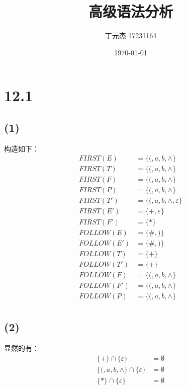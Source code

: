 \documentclass[UTF8]{ctexart}
\title{高级语法分析}
\author{丁元杰 17231164}
\date{\today}
\begin{document}
\maketitle


\section*{12.1}

    \subsection*{(1)}
        构造如下：
        \begin{align*}
            FIRST(E) &= \{(, a, b, \wedge\} \\
            FIRST(T) &= \{(, a, b, \wedge\} \\
            FIRST(F) &= \{(, a, b, \wedge\} \\
            FIRST(P) &= \{(, a, b, \wedge\} \\
            FIRST(T') &= \{(, a, b, \wedge, \varepsilon\} \\
            FIRST(E') &= \{+, \varepsilon\} \\
            FIRST(F') &= \{*\} \\
            FOLLOW(E) &= \{\#, )\} \\
            FOLLOW(E') &= \{\#, )\} \\
            FOLLOW(T) &= \{+\} \\
            FOLLOW(T') &= \{+\} \\
            FOLLOW(F) &= \{(, a, b, \wedge\} \\
            FOLLOW(F') &= \{(, a, b, \wedge\} \\
            FOLLOW(P) &= \{(, a, b, \wedge\} \\
        \end{align*}

    \subsection*{(2)}
        显然的有：
        \begin{align*}
            \{+\} \cap \{\varepsilon\} &= \emptyset \\
            \{(, a, b, \wedge\} \cap \{\varepsilon\} &= \emptyset \\
            \{*\} \cap \{\varepsilon\} &= \emptyset
        \end{align*}
\end{document}
